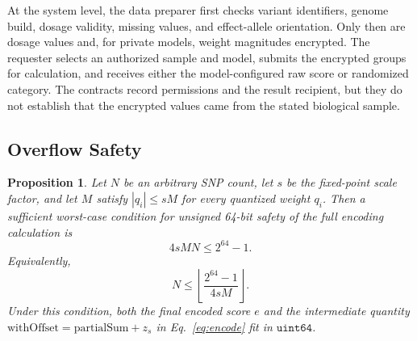 \documentclass[10pt]{article}
\newtheorem{proposition}{Proposition}
\begin{document}
At the system level, the data preparer first checks variant identifiers, genome build,
dosage validity, missing values, and effect-allele orientation. Only then are dosage values
and, for private models, weight magnitudes encrypted. The requester selects an authorized
sample and model, submits the encrypted groups for calculation, and receives either the
model-configured raw score or randomized category. The contracts record permissions and the
result recipient, but they do not establish that the encrypted values came from the stated
biological sample.

\subsection{Overflow Safety}
\label{sec:overflow}

\begin{proposition}
Let $N$ be an arbitrary SNP count, let $s$ be the fixed-point scale factor, and
let $M$ satisfy $|q_i| \leq sM$ for every quantized weight $q_i$.  Then a
sufficient worst-case condition for unsigned 64-bit safety of the full encoding
calculation is
\[
4 s M N \leq 2^{64} - 1.
\]
Equivalently,
\[
N \leq \left\lfloor \frac{2^{64} - 1}{4 s M} \right\rfloor.
\]
Under this condition, both the final encoded score $e$ and the intermediate
quantity $\mathrm{withOffset} = \mathrm{partialSum} + z_s$ in
Eq.~\ref{eq:encode} fit in $\texttt{uint64}$.
\end{proposition}
\end{document}
